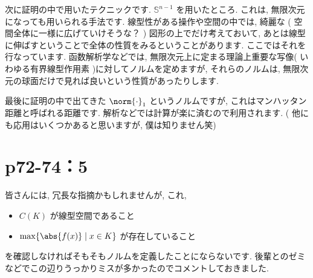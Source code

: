 \documentclass[a4paper,10pt,fleqn]{ltjsarticle}
\begin{document}
次に証明の中で用いたテクニックです.  $\mathbb{S}^{n-1}$ を用いたところ. これは, 無限次元になっても用いられる手法です. 線型性がある操作や空間の中では, 綺麗な ( 空間全体に一様に広げていけそうな？ ) 図形の上でだけ考えておいて, あとは線型に伸ばすということで全体の性質をみるということがあります. ここではそれを行なっています. 函数解析学などでは, 無限次元上に定まる理論上重要な写像( いわゆる有界線型作用素 )に対してノルムを定めますが, それらのノルムは, 無限次元の球面だけで見れば良いという性質があったりします. 

最後に証明の中で出てきた $\norm{ \cdot } _ 1$ というノルムですが, これはマンハッタン距離と呼ばれる距離です. 解析などでは計算が楽に済むので利用されます. ( 他にも応用はいくつかあると思いますが, 僕は知りません笑)
\newpage

\section*{p72-74：5}
皆さんには, 冗長な指摘かもしれませんが, これ, 
	\begin{itemize}
		\item $C ( K )$ が線型空間であること
		\item $\max \{ \abs{ f ( x )} \mid x \in K \}$ が存在していること
\end{itemize}
を確認しなければそもそもノルムを定義したことにならないです. 後輩とのゼミなどでこの辺りうっかりミスが多かったのでコメントしておきました. \\
\end{document}
